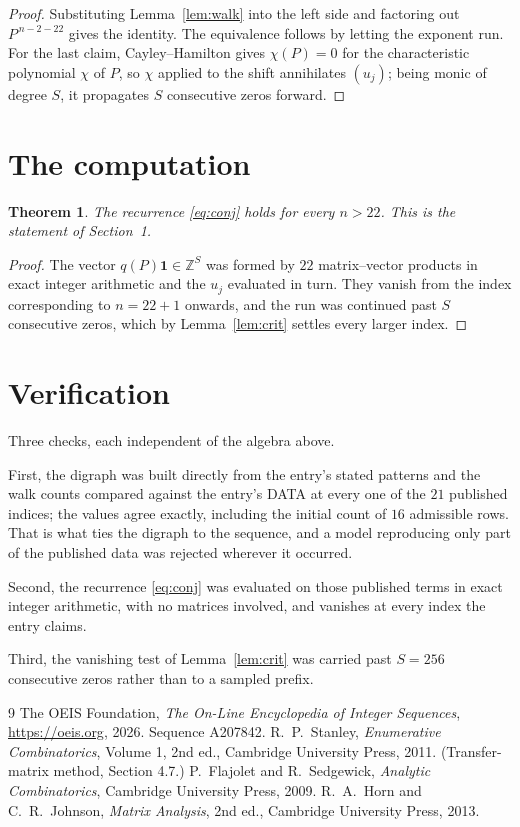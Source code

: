 \documentclass[11pt,a4paper]{article}
\theoremstyle{plain}
\newtheorem{theorem}{Theorem}
\theoremstyle{definition}
\begin{document}
\begin{proof}
Substituting Lemma~\ref{lem:walk} into the left side and factoring out
$P^{\,n-2-22}$ gives the identity. The equivalence follows by letting the exponent
run. For the last claim, Cayley--Hamilton gives $\chi(P)=0$ for the characteristic
polynomial $\chi$ of $P$, so $\chi$ applied to the shift annihilates $(u_j)$; being monic of
degree $S$, it propagates $S$ consecutive zeros forward.
\end{proof}

\section{The computation}

\begin{theorem}
The recurrence \eqref{eq:conj} holds for every $n>22$. This is the statement of
Section~1.
\end{theorem}

\begin{proof}
The vector $q(P)\mathbf{1}\in\mathbb{Z}^{S}$ was formed by $22$ matrix--vector
products in exact integer arithmetic and the $u_j$ evaluated in turn. They vanish from the
index corresponding to $n=22+1$ onwards, and the run was continued past $S$ consecutive
zeros, which by Lemma~\ref{lem:crit} settles every larger index.
\end{proof}

\section{Verification}

Three checks, each independent of the algebra above.

First, the digraph was built directly from the entry's stated patterns and the walk counts
compared against the entry's DATA at every one of the $21$ published indices; the
values agree exactly, including the initial count of $16$ admissible rows. That is
what ties the digraph to the sequence, and a model reproducing only part of the published
data was rejected wherever it occurred.

Second, the recurrence \eqref{eq:conj} was evaluated on those published terms in exact
integer arithmetic, with no matrices involved, and vanishes at every index the entry claims.

Third, the vanishing test of Lemma~\ref{lem:crit} was carried past $S=256$ consecutive
zeros rather than to a sampled prefix.

\begin{thebibliography}{9}
 The OEIS Foundation, \emph{The On-Line Encyclopedia of Integer
Sequences}, \url{https://oeis.org}, 2026. Sequence A207842.
 R.~P.~Stanley, \emph{Enumerative Combinatorics}, Volume 1, 2nd ed.,
Cambridge University Press, 2011. (Transfer-matrix method, Section 4.7.)
 P.~Flajolet and R.~Sedgewick, \emph{Analytic Combinatorics}, Cambridge
University Press, 2009.
 R.~A.~Horn and C.~R.~Johnson, \emph{Matrix Analysis}, 2nd ed., Cambridge
University Press, 2013.
\end{thebibliography}
\end{document}

